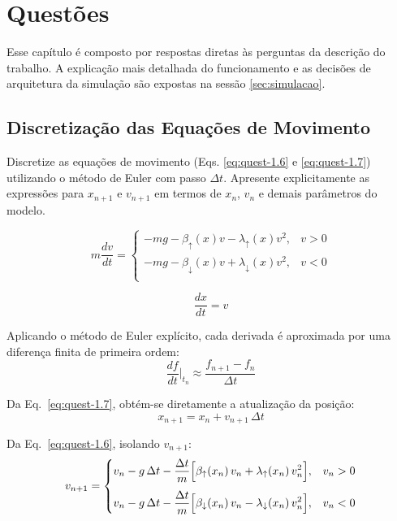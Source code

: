 \section{Questões}
\label{sec:questoes}

Esse capítulo é composto por respostas diretas às perguntas da descrição do trabalho. A explicação mais detalhada do funcionamento e as decisões de arquitetura da simulação são expostas na sessão \ref{sec:simulacao}.

\subsection{Discretização das Equações de Movimento}

\begin{questao}
Discretize as equações de movimento (Eqs. \ref{eq:quest-1.6} e \ref{eq:quest-1.7}) utilizando o método de Euler com passo $\Delta t$.
Apresente explicitamente as expressões para $x_{n+1}$ e $v_{n+1}$ em termos de $x_n$, $v_n$ e demais parâmetros do modelo.

\begin{equation}
    \label{eq:quest-1.6}
    m\frac{dv}{dt} = \begin{cases}
        -mg - \beta_\uparrow(x)v - \lambda_\uparrow(x)v^2, & v > 0\\
        -mg - \beta_\downarrow(x)v + \lambda_\downarrow(x)v^2, & v < 0\\
    \end{cases}
\end{equation}

\begin{equation}
    \label{eq:quest-1.7}
    \frac{dx}{dt} = v
\end{equation}
\end{questao}

Aplicando o método de Euler explícito, cada derivada é aproximada por uma diferença finita de primeira ordem:
\begin{equation*}
    \frac{df}{dt}\bigg|_{t_n} \approx \frac{f_{n+1} - f_n}{\Delta t}
\end{equation*}

Da Eq.~\ref{eq:quest-1.7}, obtém-se diretamente a atualização da posição:
\begin{equation}
    \label{eq:euler-x}
    x_{n+1} = x_n + v_{n+1}\,\Delta t
\end{equation}

Da Eq.~\ref{eq:quest-1.6}, isolando $v_{n+1}$:
\begin{equation}
    \label{eq:euler-v}
    v_{n+1} = \begin{cases}
        \displaystyle v_n - g\,\Delta t
            - \frac{\Delta t}{m}\Bigl[\beta_\uparrow(x_n)\,v_n + \lambda_\uparrow(x_n)\,v_n^2\Bigr],
        & v_n > 0 \\[10pt]
        \displaystyle v_n - g\,\Delta t
            - \frac{\Delta t}{m}\Bigl[\beta_\downarrow(x_n)\,v_n - \lambda_\downarrow(x_n)\,v_n^2\Bigr],
        & v_n < 0
    \end{cases}
\end{equation}

